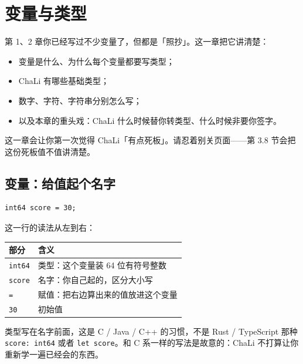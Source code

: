 \chapter{变量与类型}
\label{ch:03}

第 1、2 章你已经写过不少变量了，但都是「照抄」。这一章把它讲清楚：

\begin{itemize}

\item 变量是什么、为什么每个变量都要写类型；

\item ChaLi 有哪些基础类型；

\item 数字、字符、字符串分别怎么写；

\item 以及本章的重头戏：ChaLi 什么时候替你转类型、什么时候非要你签字。

\end{itemize}

这一章会让你第一次觉得 ChaLi「有点死板」。请忍着别关页面——第 3.8 节会把这份死板值不值讲清楚。

\section{变量：给值起个名字}

\par
\medskip
\begin{lstlisting}[style=chali]
int64 score = 30;
\end{lstlisting}
\par
\medskip

这一行的读法从左到右：

\begin{center}
\begin{tabular}{ll}
\toprule
部分 & 含义 \\
\midrule
\texttt{int64} & 类型：这个变量装 64 位有符号整数 \\
\texttt{score} & 名字：你自己起的，区分大小写 \\
\texttt{=\allowbreak{}} & 赋值：把右边算出来的值放进这个变量 \\
\texttt{30} & 初始值 \\
\bottomrule
\end{tabular}
\end{center}

类型写在名字前面，这是 C / Java / C++ 的习惯，不是 Rust / TypeScript 那种\texttt{score:\allowbreak{} int64} 或者 \texttt{let score}。和 C 系一样的写法是故意的：ChaLi 不打算让你重新学一遍已经会的东西。

